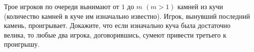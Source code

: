 \documentclass{article}
\begin{document}
Трое игроков по очереди вынимают от $1$ до $m$ $(m>1)$ камней из кучи (количество камней в куче им изначально известно). Игрок, вынувший последний камень, проигрывает. Докажите, что если изначально куча была достаточно велика, то любые два игрока, договорившись, сумеют привести третьего к проигрышу.
\end{document}
